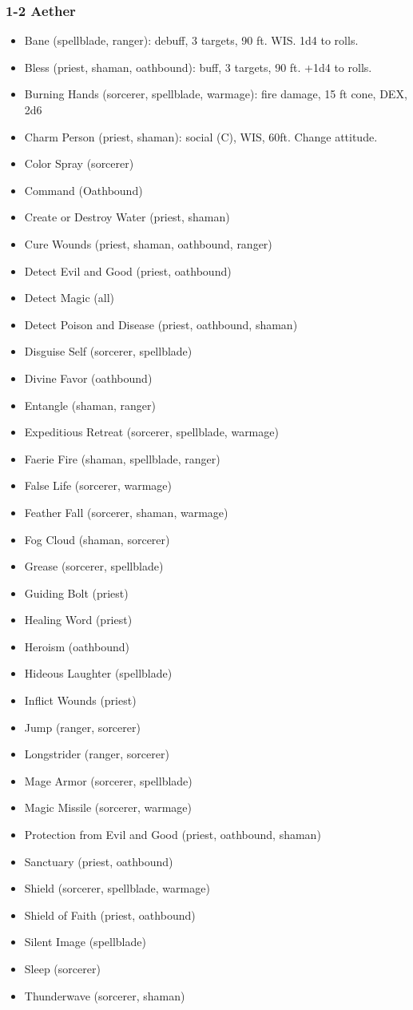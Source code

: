\subsubsection{1-2 Aether}
\begin{itemize}
\item Bane (spellblade, ranger): debuff, 3 targets, 90 ft. WIS. \textminus 1d4 to rolls.
\item Bless (priest, shaman, oathbound): buff, 3 targets, 90 ft. +1d4 to rolls.
\item Burning Hands (sorcerer, spellblade, warmage): fire damage, 15 ft cone, DEX, 2d6
\item Charm Person (priest, shaman): social (C), WIS, 60ft. Change attitude. 
\item Color Spray (sorcerer)
\item Command (Oathbound)
\item Create or Destroy Water (priest, shaman)
\item Cure Wounds (priest, shaman, oathbound, ranger)
\item Detect Evil and Good (priest, oathbound)
\item Detect Magic (all)
\item Detect Poison and Disease (priest, oathbound, shaman)
\item Disguise Self (sorcerer, spellblade)
\item Divine Favor (oathbound)
\item Entangle (shaman, ranger)
\item Expeditious Retreat (sorcerer, spellblade, warmage)
\item Faerie Fire (shaman, spellblade, ranger)
\item False Life (sorcerer, warmage)
\item Feather Fall (sorcerer, shaman, warmage)
\item Fog Cloud (shaman, sorcerer)
\item Grease (sorcerer, spellblade)
\item Guiding Bolt (priest)
\item Healing Word (priest)
\item Heroism (oathbound)
\item Hideous Laughter (spellblade)
\item Inflict Wounds (priest)
\item Jump (ranger, sorcerer)
\item Longstrider (ranger, sorcerer)
\item Mage Armor (sorcerer, spellblade)
\item Magic Missile (sorcerer, warmage)
\item Protection from Evil and Good (priest, oathbound, shaman)
\item Sanctuary (priest, oathbound)
\item Shield (sorcerer, spellblade, warmage)
\item Shield of Faith (priest, oathbound)
\item Silent Image (spellblade)
\item Sleep (sorcerer)
\item Thunderwave (sorcerer, shaman)
\end{itemize}

